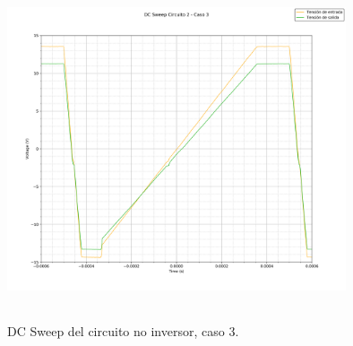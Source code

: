 \begin{figure}[H] %
	\centering
	\includegraphics[width=10cm,height=10cm,keepaspectratio]{../EJ1/00GRAFICOS/c2dcs/c2c3dcs.png}
	\caption{DC Sweep del circuito no inversor, caso 3.}
	\label{c2c2dcs}
\end{figure}
